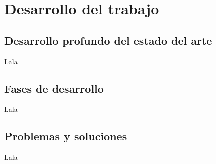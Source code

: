 \chapter{Desarrollo del trabajo}

\section{Desarrollo profundo del estado del arte}

Lala

\section{Fases de desarrollo}

Lala

\section{Problemas y soluciones}

Lala